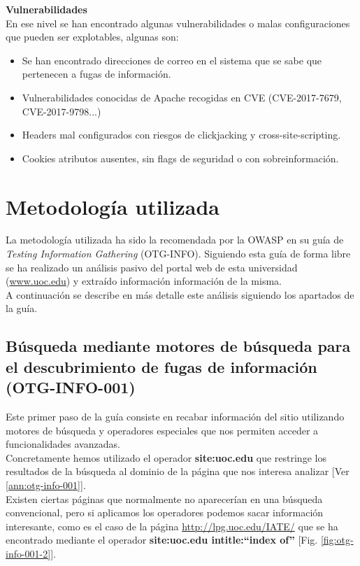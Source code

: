 \documentclass[10pt,a4paper]{article}
\begin{document}
\textbf{Vulnerabilidades}\\
En ese nivel se han encontrado algunas vulnerabilidades o malas configuraciones que pueden ser explotables, algunas son:
\begin{itemize}
\item Se han encontrado direcciones de correo en el sistema que se sabe que pertenecen a fugas de información.
\item Vulnerabilidades conocidas de Apache recogidas en CVE (CVE-2017-7679, CVE-2017-9798...)
\item Headers mal configurados con riesgos de clickjacking y cross-site-scripting.
\item Cookies atributos ausentes, sin flags de seguridad o con sobreinformación.
\end{itemize}

\section{Metodología utilizada}

La metodología utilizada ha sido la recomendada por la OWASP en su guía de \textit{Testing Information Gathering} (OTG-INFO)\cite{owasp}. Siguiendo esta guía de forma libre se ha realizado un análisis pasivo del portal web de esta universidad (\url{www.uoc.edu}) y extraído información información de la misma.\\

A continuación se describe en más detalle este análisis siguiendo los apartados de la guía.
\subsection{Búsqueda mediante motores de búsqueda para el descubrimiento de fugas de información (OTG-INFO-001)}
\label{OTF-INFO-001}
Este primer paso de la guía consiste en recabar información del sitio utilizando motores de búsqueda y operadores especiales que nos permiten acceder a funcionalidades avanzadas.\\ Concretamente hemos utilizado el operador \textbf{site:uoc.edu} que restringe los resultados de la búsqueda al dominio de la página que nos interesa analizar [Ver \ref{ann:otg-info-001}].\\
Existen ciertas páginas que normalmente no aparecerían en una búsqueda convencional, pero si aplicamos los operadores podemos sacar información interesante, como es el caso de la página \url{http://lpg.uoc.edu/IATE/} que se ha encontrado mediante el operador \textbf{site:uoc.edu intitle:``index of''} [Fig. \ref{fig:otg-info-001-2}].
\end{document}
